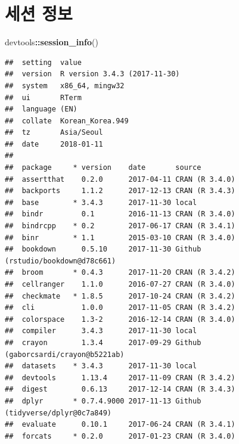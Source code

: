 \documentclass[12pt,]{krantz}
\newenvironment{Shaded}{\begin{snugshade}}{\end{snugshade}}
\newcommand{\KeywordTok}[1]{\textcolor[rgb]{0.13,0.29,0.53}{\textbf{#1}}}
\newcommand{\OperatorTok}[1]{\textcolor[rgb]{0.81,0.36,0.00}{\textbf{#1}}}
\newcommand{\NormalTok}[1]{#1}
\theoremstyle{definition}
\theoremstyle{definition}
\theoremstyle{definition}
\theoremstyle{remark}
\begin{document}
\chapter{세션 정보}\label{session-info}

\begin{Shaded}
\begin{Highlighting}[]
\NormalTok{devtools}\OperatorTok{::}\KeywordTok{session_info}\NormalTok{()}
\end{Highlighting}
\end{Shaded}

\begin{verbatim}
##  setting  value                       
##  version  R version 3.4.3 (2017-11-30)
##  system   x86_64, mingw32             
##  ui       RTerm                       
##  language (EN)                        
##  collate  Korean_Korea.949            
##  tz       Asia/Seoul                  
##  date     2018-01-11                  
## 
##  package     * version    date       source                              
##  assertthat    0.2.0      2017-04-11 CRAN (R 3.4.0)                      
##  backports     1.1.2      2017-12-13 CRAN (R 3.4.3)                      
##  base        * 3.4.3      2017-11-30 local                               
##  bindr         0.1        2016-11-13 CRAN (R 3.4.0)                      
##  bindrcpp    * 0.2        2017-06-17 CRAN (R 3.4.1)                      
##  binr        * 1.1        2015-03-10 CRAN (R 3.4.0)                      
##  bookdown      0.5.10     2017-11-30 Github (rstudio/bookdown@d78c661)   
##  broom       * 0.4.3      2017-11-20 CRAN (R 3.4.2)                      
##  cellranger    1.1.0      2016-07-27 CRAN (R 3.4.0)                      
##  checkmate   * 1.8.5      2017-10-24 CRAN (R 3.4.2)                      
##  cli           1.0.0      2017-11-05 CRAN (R 3.4.2)                      
##  colorspace    1.3-2      2016-12-14 CRAN (R 3.4.0)                      
##  compiler      3.4.3      2017-11-30 local                               
##  crayon        1.3.4      2017-09-29 Github (gaborcsardi/crayon@b5221ab) 
##  datasets    * 3.4.3      2017-11-30 local                               
##  devtools      1.13.4     2017-11-09 CRAN (R 3.4.2)                      
##  digest        0.6.13     2017-12-14 CRAN (R 3.4.3)                      
##  dplyr       * 0.7.4.9000 2017-11-13 Github (tidyverse/dplyr@0c7a849)    
##  evaluate      0.10.1     2017-06-24 CRAN (R 3.4.1)                      
##  forcats     * 0.2.0      2017-01-23 CRAN (R 3.4.0)                      

\end{verbatim}
\end{document}
